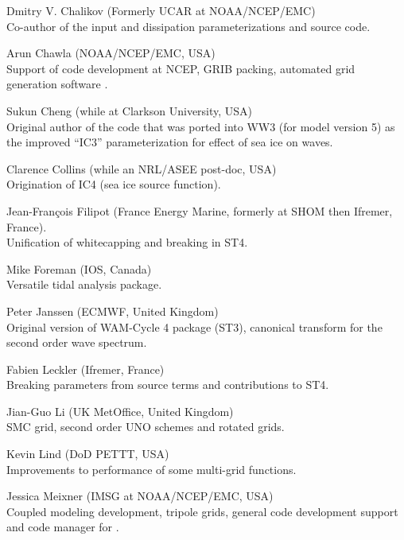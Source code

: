 \begin{list}{\ldots}{ }
\item [Dmitry V. Chalikov] (Formerly UCAR at NOAA/NCEP/EMC) \\ Co-author of the
  \cite{tol:JPO96} input and dissipation parameterizations and source code.

\item [Arun Chawla](NOAA/NCEP/EMC, USA) \\
  Support of code development at NCEP, GRIB packing, automated grid generation
  software \citep{tol:MMAB07a, tol:OMOD08a}.

\item [Sukun Cheng] (while at Clarkson University, USA) \\
  Original author of the code that was ported into WW3 (for model version 5) as the improved ``IC3'' parameterization for effect of sea ice on waves.

\item [Clarence Collins] (while an NRL/ASEE post-doc, USA) \\
  Origination of IC4 (sea ice source function).

\item [Jean-Fran{\c c}ois Filipot] (France Energy Marine, formerly at SHOM then Ifremer, France).\\
  Unification of whitecapping and breaking in ST4. 

\item [Mike Foreman]  (IOS, Canada) \\
  Versatile tidal analysis package. 

\item [Peter Janssen] (ECMWF, United Kingdom) \\
  Original version of WAM-Cycle 4 package (ST3), canonical transform for the second order wave spectrum.

\item [Fabien Leckler] (Ifremer, France) \\
  Breaking parameters from source terms and contributions to ST4.

\item [Jian-Guo Li] (UK MetOffice, United Kingdom) \\
  SMC grid, second order UNO schemes and rotated grids.

\item [Kevin Lind]  (DoD PETTT, USA)\\ 
  Improvements to performance of some multi-grid functions.

\item [Jessica Meixner] (IMSG at NOAA/NCEP/EMC, USA) \\
  Coupled modeling development, tripole grids, general code development support  and code manager for \ws.
 

\end{list}
